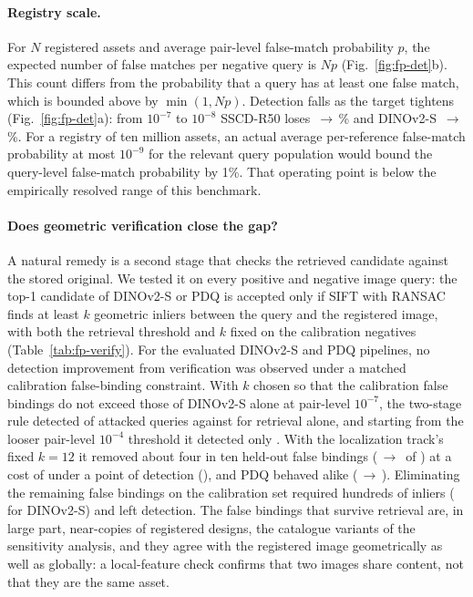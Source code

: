 \paragraph{Registry scale.} For $N$ registered assets and average pair-level false-match probability $p$, the expected number of false matches per negative query is $Np$ (Fig.~\ref{fig:fp-det}b). This count differs from the probability that a query has at least one false match, which is bounded above by $\min(1,Np)$. Detection falls as the target tightens (Fig.~\ref{fig:fp-det}a): from $10^{-7}$ to $10^{-8}$ SSCD-R50 loses \,$\to$\,\% and DINOv2-S \,$\to$\,\%. For a registry of ten million assets, an actual average per-reference false-match probability at most $10^{-9}$ for the relevant query population would bound the query-level false-match probability by 1\%. That operating point is below the empirically resolved range of this benchmark.

\paragraph{Does geometric verification close the gap?} A natural remedy is a second stage that checks the retrieved candidate against the stored original. We tested it on every positive and negative image query: the top-1 candidate of DINOv2-S or PDQ is accepted only if SIFT with RANSAC finds at least $k$ geometric inliers between the query and the registered image, with both the retrieval threshold and $k$ fixed on the calibration negatives (Table~\ref{tab:fp-verify}). For the evaluated DINOv2-S and PDQ pipelines, no detection improvement from verification was observed under a matched calibration false-binding constraint. With $k$ chosen so that the calibration false bindings do not exceed those of DINOv2-S alone at pair-level $10^{-7}$, the two-stage rule detected  of attacked queries against  for retrieval alone, and starting from the looser pair-level $10^{-4}$ threshold it detected only . With the localization track's fixed $k=12$ it removed about four in ten held-out false bindings ($\,\to\,$ of ) at a cost of under a point of detection (), and PDQ behaved alike ($\,\to\,$). Eliminating the remaining false bindings on the calibration set required hundreds of inliers ( for DINOv2-S) and left  detection. The false bindings that survive retrieval are, in large part, near-copies of registered designs, the catalogue variants of the sensitivity analysis, and they agree with the registered image geometrically as well as globally: a local-feature check confirms that two images share content, not that they are the same asset.

